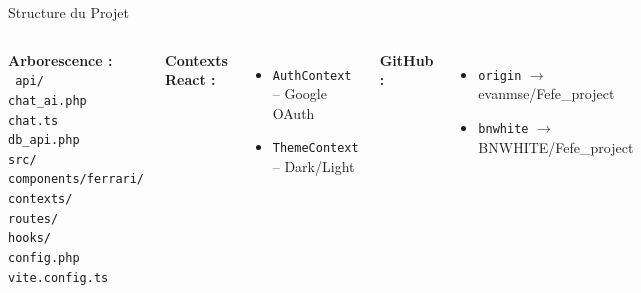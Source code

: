 \documentclass[11pt,aspectratio=169]{beamer}
\begin{document}
\begin{frame}{Structure du Projet}
  \begin{columns}
    \textbf{\textcolor{ferrariRed}{Arborescence :}} \\[0.2cm]
    \texttt{%
    api/ \\
    \quad chat\_ai.php \\
    \quad chat.ts \\
    \quad db\_api.php \\
    src/ \\
    \quad components/ferrari/ \\
    \quad contexts/ \\
    \quad routes/ \\
    \quad hooks/ \\
    config.php \\
    vite.config.ts}

    \textbf{\textcolor{ferrariRed}{Contexts React :}} \\[0.2cm]
    \begin{itemize}
      \item \texttt{AuthContext} -- Google OAuth
      \item \texttt{ThemeContext} -- Dark/Light
    \end{itemize}

    \vspace{0.3cm}
    \textbf{\textcolor{ferrariRed}{GitHub :}} \\[0.2cm]
    \begin{itemize}
      \item \texttt{origin} $\rightarrow$ evanmse/Fefe\_project
      \item \texttt{bnwhite} $\rightarrow$ BNWHITE/Fefe\_project
    \end{itemize}
  \end{columns}
\end{frame}
\end{document}
